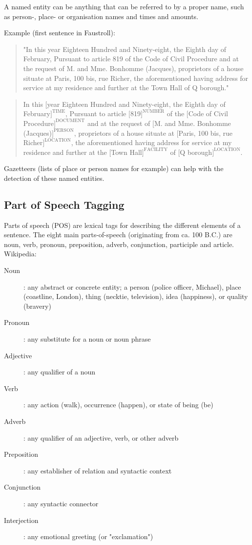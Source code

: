 A named entity can be anything that can be referred to by a proper name, such as person-, place- or organisation names and times and amounts.

Example (first sentence in Faustroll):

\begin{quote}
  "In this year Eighteen Hundred and Ninety-eight, the Eighth day of February, Pursuant to article 819 of the Code of Civil Procedure and at the request of M. and Mme. Bonhomme (Jacques), proprietors of a house situate at Paris, 100 bis, rue Richer, the aforementioned having address for service at my residence and further at the Town Hall of Q borough."
\end{quote}

\begin{quote}
  In this $[$year Eighteen Hundred and Ninety-eight, the Eighth day of February$]^{\text{TIME}}$, Pursuant to article $[$819$]^{\text{NUMBER}}$ of the $[$Code of Civil Procedure$]^{\text{DOCUMENT}}$ and at the request of $[$M. and Mme. Bonhomme (Jacques)$]^{\text{PERSON}}$, proprietors of a house situate at $[$Paris, 100 bis, rue Richer$]^{\text{LOCATION}}$, the aforementioned having address for service at my residence and further at the $[$Town Hall$]^{\text{FACILITY}}$ of $[$Q borough$]^{\text{LOCATION}}$.
\end{quote}

Gazetteers (lists of place or person names for example) can help with the detection of these named entities.

\subsection*{Part of Speech Tagging}

Parts of speech (POS) are lexical tags for describing the different elements of a sentence. The eight main parts-of-speech (originating from ca. 100 B.C.) are noun, verb, pronoun, preposition, adverb, conjunction, participle and article.
Wikipedia:

\begin{description}
  \item [Noun]: any abstract or concrete entity; a person (police officer, Michael), place (coastline, London), thing (necktie, television), idea (happiness), or quality (bravery)
  \item [Pronoun]: any substitute for a noun or noun phrase
  \item [Adjective]: any qualifier of a noun
  \item [Verb]: any action (walk), occurrence (happen), or state of being (be)
  \item [Adverb]: any qualifier of an adjective, verb, or other adverb
  \item [Preposition]: any establisher of relation and syntactic context
  \item [Conjunction]: any syntactic connector
  \item [Interjection]: any emotional greeting (or "exclamation")
\end{description}

